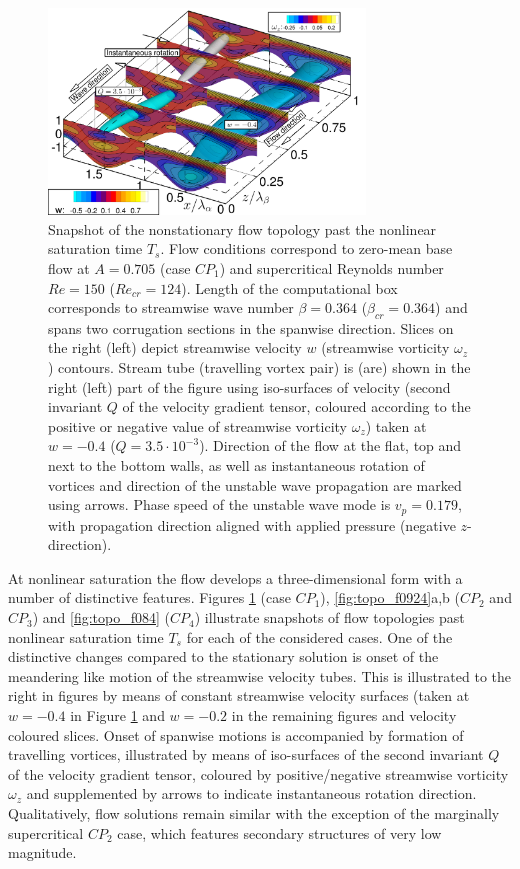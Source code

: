 \documentclass[lineno]{jfm}
\begin{document}
\begin{figure}
\centering
    \includegraphics[width=0.75\textwidth]{figure14.png}
	\caption{Snapshot of the nonstationary flow topology past the nonlinear saturation time $T_s$. Flow conditions correspond to zero-mean base flow at $A=0.705$ (case $CP_1$) and supercritical Reynolds number $Re=150$ ($Re_{cr}=124$). Length of the computational box corresponds to streamwise wave number $\beta=0.364$ ($\beta_{cr}=0.364$) and spans two corrugation sections in the spanwise direction. Slices on the right (left) depict streamwise velocity $w$ (streamwise vorticity $\omega_z$) contours. Stream tube (travelling vortex pair) is (are) shown in the right (left) part of the figure using iso-surfaces of velocity (second invariant $Q$ of the velocity gradient tensor, coloured according to the positive or negative value of streamwise vorticity $\omega_z$) taken at $w=-0.4$ ($Q=3.5\cdot10^{-3}$). Direction of the flow at the flat, top and next to the bottom walls, as well as instantaneous rotation of vortices and direction of the unstable wave propagation are marked using arrows. Phase speed of the unstable wave mode is $v_p=0.179$, with propagation direction aligned with applied pressure (negative $z$-direction).}
	\label{fig:topo_f141}
\end{figure}

At nonlinear saturation the flow develops a three-dimensional form with a number of distinctive features.
Figures \ref{fig:topo_f141} (case $CP_1$), \ref{fig:topo_f0924}a,b ($CP_2$ and $CP_3$) and \ref{fig:topo_f084} ($CP_4$) illustrate snapshots of flow topologies past nonlinear saturation time $T_s$ for each of the considered cases.
One of the distinctive changes compared to the stationary solution is onset of the meandering like motion of the streamwise velocity tubes.
This is illustrated to the right in figures by means of constant streamwise velocity surfaces (taken at $w=-0.4$ in Figure \ref{fig:topo_f141} and $w=-0.2$ in the remaining figures and velocity coloured slices.
Onset of spanwise motions is accompanied by formation of travelling vortices, illustrated by means of iso-surfaces of the second invariant $Q$ of the velocity gradient tensor, coloured by positive/negative streamwise vorticity $\omega_z$ and supplemented by arrows to indicate instantaneous rotation direction.
Qualitatively, flow solutions remain similar with the exception of the marginally supercritical $CP_2$ case, which features secondary structures of very low magnitude.
\end{document}
